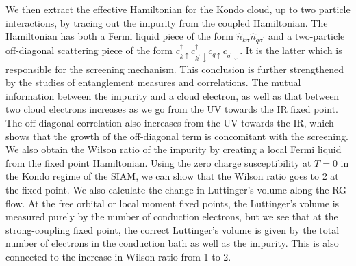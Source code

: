 We then extract the effective Hamiltonian for the Kondo cloud, up to two particle interactions, by tracing out the impurity from the coupled Hamiltonian. The Hamiltonian has both a Fermi liquid piece of the form \(\hat n_{k\sigma}\hat n_{q\sigma^\prime}\) and a two-particle off-diagonal scattering piece of the form \(c^\dagger_{k \uparrow}c^\dagger_{k^\prime \downarrow}c_{q \uparrow}c_{q^\prime \downarrow}\). It is the latter which is responsible for the screening mechanism. This conclusion is further strengthened by the studies of entanglement measures and correlations. The mutual information between the impurity and a cloud electron, as well as that between two cloud electrons increases as we go from the UV towards the IR fixed point. The off-diagonal correlation also increases from the UV towards the IR, which shows that the growth of the off-diagonal term is concomitant with the screening.
We also obtain the Wilson ratio of the impurity by creating a local Fermi liquid from the fixed point Hamiltonian. Using the zero charge susceptibility at \(T=0\) in the Kondo regime of the SIAM, we can show that the Wilson ratio goes to 2 at the fixed point. We also calculate the change in Luttinger's volume along the RG flow. At the free orbital or local moment fixed points, the Luttinger's volume is measured purely by the number of conduction electrons, but we see that at the strong-coupling fixed point, the correct Luttinger's volume is given by the total number of electrons in the conduction bath as well as the impurity. This is also connected to the increase in Wilson ratio from 1 to 2.
